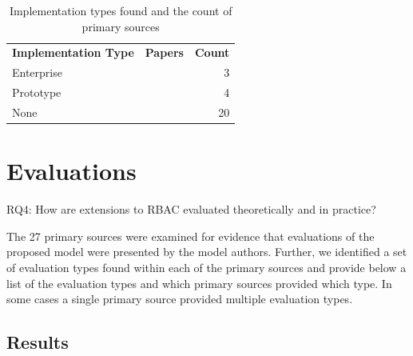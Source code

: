 \begin{table}
\centering
\caption{Implementation types found and the count of primary sources}
\vspace{0.1 in}
\begin{tabular*}{.9\linewidth}{| l | p{.5\linewidth} | r | }
\cline{1-3}

\textbf{Implementation Type} & \textbf{Papers} & \textbf{Count} \\ \cline{1-3}
Enterprise
&
\cite{motta03:contextual}
\cite{aich09:role}
\cite{yao2008task}
&
3 \\ \cline{1-3}
Prototype
& 
\cite{cholewka00:acontext-sensitive}
\cite{huang06:pervasive}
\cite{bao08:role}
\cite{zhou07:network}
&
4 \\ \cline{1-3}
None
&
\cite{alam06:constraint}
\cite{tzelepi01:flexible}
\cite{yamazaki04:designing}
\cite{jian2008extended}
\cite{thein2011leveraging}
\cite{zou2009crbac}
\cite{haibo05:context}
\cite{zhang06:collaborative}
\cite{ni2010privacy}
\cite{masoumzadeh2008purbac}
\cite{damiani2007geo}
\cite{ray2006lrbac}
\cite{hansen2003spatial}
\cite{aich07:STARBAC}
\cite{chen08:spatio-temporal}
\cite{samuel07:spatio-temporal}
\cite{chandran05:llt}
\cite{ray07:spatio}
\cite{oh2003task}
\cite{joshi05:generalized}
&
20 \\

\cline{1-3}
\end{tabular*}
\label{tab:implementations}
\end{table}

\section{Evaluations} \label{sec:evaluations}

RQ4: How are extensions to RBAC evaluated theoretically and in practice?

The 27 primary sources were examined for evidence that evaluations of the proposed model were presented by the model authors.
Further, we identified a set of evaluation types found within  each of the primary sources and provide below a list of the 
evaluation types and which primary sources provided which type.  In some cases a single primary source provided multiple evaluation
types.

\subsection{Results}

